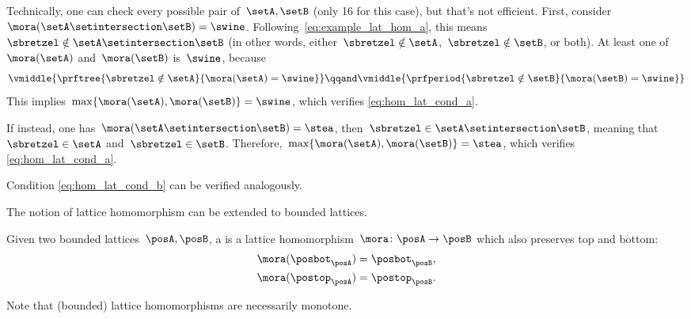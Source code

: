 \begin{example}
	Technically, one can check every possible pair of~$\setA,\setB$ (only 16 for this case), but that's not efficient.
	First, consider~$\mora(\setA\setintersection \setB)=\swine$.
	Following~\cref{eq:example_lat_hom_a}, this means~$\sbretzel \notin \setA\setintersection \setB$ (in other words, either~$\sbretzel \notin \setA$,~$\sbretzel \notin \setB$, or both).
	At least one of~$\mora(\setA)$ and~$\mora(\setB)$ is~$\swine$, because
	\begin{equation*}
		\vmiddle{
			\prftree{
				\sbretzel \notin \setA
			}{
				\mora(\setA) = \swine
			}
		}
		\qqand
		\vmiddle{
			\prfperiod{
				\sbretzel \notin \setB
			}{
				\mora(\setB) = \swine
			}
		}
	\end{equation*}
	This implies~$\max\{\mora(\setA),\mora(\setB)\}=\swine$, which verifies \cref{eq:hom_lat_cond_a}.

	If instead, one has~$\mora(\setA\setintersection \setB)=\stea$, then~$\sbretzel \in \setA\setintersection \setB$, meaning that~$\sbretzel \in \setA$ and~$\sbretzel \in \setB$.
	Therefore,~$\max\{ \mora(\setA),\mora(\setB)\}=\stea$, which verifies \cref{eq:hom_lat_cond_a}.

	Condition \cref{eq:hom_lat_cond_b} can be verified analogously.
\end{example}

The notion of lattice homomorphism can be extended to bounded lattices.

\begin{ctdefinition}
	\label{def:bounded_lat_homomorphism}
	Given two bounded lattices~$\posA,\posB$, a \emph{} is a lattice homomorphism~$\mora\colon \posA\to \posB$ which also preserves top and bottom:
	\begin{equation}
		\begin{aligned}
			\mora(\posbot_\posA) & =\posbot_\posB, \\
			\mora(\postop_\posA) & =\postop_\posB.
		\end{aligned}
	\end{equation}
\end{ctdefinition}

Note that (bounded) lattice homomorphisms are necessarily monotone.


